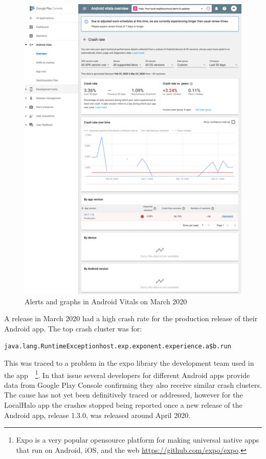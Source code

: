 \begin{figure}[htbp!]
\begin{minipage}{.45\textwidth}
\end{minipage}\hfill%
\begin{minipage}{.45\textwidth}
  \centering
  \includegraphics[width=\textwidth]{images/localhalo/apphealthdetailsplace_55505963_high_errors.png}
\end{minipage}
    \caption{Alerts and graphs in Android Vitals on  March 2020}
    \label{fig:localhalo-android-vitals-high-failures-26-march-2020}
\end{figure}

A release in March 2020 had a high crash rate for the production release of their Android app. The top crash cluster was for:

{\small \texttt{java.lang.RuntimeExceptionhost.exp.exponent.experience.a\$b.run}} 

This was traced to a problem in the expo library the development team used in the app~\citep{expo2019_issue5839}~\footnote{Expo is a very popular opensource platform for making universal native apps that run on Android, iOS, and the web \url{https://github.com/expo/expo}.}. In that issue several developers for different Android apps provide data from Google Play Console confirming they also receive similar crash clusters. The cause has not yet been definitively traced or addressed, however for the LocalHalo app the crashes stopped being reported once a new release of the Android app, release 1.3.0, was released around  April 2020.


